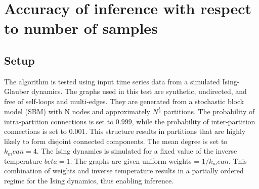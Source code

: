 \documentclass{article}
\begin{document}
\section{Accuracy of inference with respect to number of samples}
\subsection{Setup}
The algorithm is tested using input time series data from a simulated Ising-Glauber dynamics.
    The graphs used in this test are synthetic, undirected, and free of self-loops and multi-edges.
    They are generated from a stochastic block model (SBM) with N nodes and approximately  $N^{\frac{1}{3}}$  partitions.
    The probability of intra-partition connections is set to $0.999$, while the probability of inter-partition connections is set to $0.001$. This structure results in partitions that are highly likely to form disjoint connected components. The mean degree is set to $k_mean = 4$. The Ising dynamics is simulated for a fixed value of the inverse temperature $beta = 1$. The graphs are given uniform weights = $1/ k_mean$. This combination of weights and inverse temperature results in a partially ordered regime for the Ising dynamics, thus enabling inference.
\end{document}
